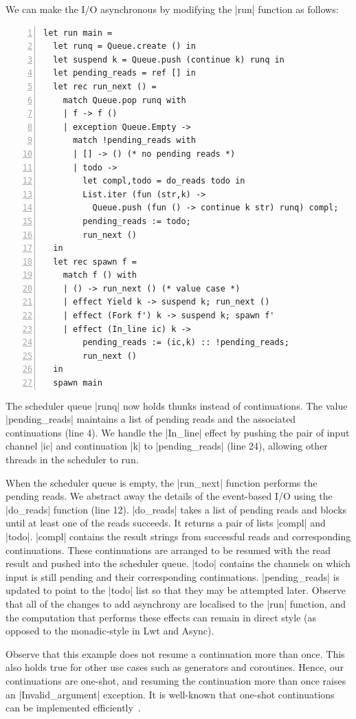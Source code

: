 \documentclass[sigplan,screen]{acmart}
\begin{document}
We can make the I/O asynchronous by modifying the |run| function as follows:

\begin{lstlisting}[numbers=left]
let run main =
  let runq = Queue.create () in
  let suspend k = Queue.push (continue k) runq in
  let pending_reads = ref [] in
  let rec run_next () =
    match Queue.pop runq with
    | f -> f ()
    | exception Queue.Empty ->
      match !pending_reads with
      | [] -> () (* no pending reads *)
      | todo ->
        let compl,todo = do_reads todo in
        List.iter (fun (str,k) ->
          Queue.push (fun () -> continue k str) runq) compl;
        pending_reads := todo;
        run_next ()
  in
  let rec spawn f =
    match f () with
    | () -> run_next () (* value case *)
    | effect Yield k -> suspend k; run_next ()
    | effect (Fork f') k -> suspend k; spawn f'
    | effect (In_line ic) k ->
        pending_reads := (ic,k) :: !pending_reads;
        run_next ()
  in
  spawn main
\end{lstlisting}

The scheduler queue |runq| now holds thunks instead of continuations. The value
|pending_reads| maintains a list of pending reads and the associated
continuations (line 4). We handle the |In_line| effect by pushing the pair of
input channel |ic| and continuation |k| to |pending_reads| (line 24), allowing
other threads in the scheduler to run.

When the scheduler queue is empty, the |run_next| function performs the pending
reads. We abstract away the details of the event-based I/O using the |do_reads|
function (line 12). |do_reads| takes a list of pending reads and blocks until
at least one of the reads succeeds. It returns a pair of lists |compl| and
|todo|. |compl| contains the result strings from successful reads and
corresponding continuations. These continuations are arranged to be resumed
with the read result and pushed into the scheduler queue. |todo| contains the
channels on which input is still pending and their corresponding continuations.
|pending_reads| is updated to point to the |todo| list so that they may be
attempted later. Observe that all of the changes to add asynchrony are
localised to the |run| function, and the computation that performs these
effects can remain in direct style (as opposed to the monadic-style in
Lwt and Async).

Observe that this example does not resume a continuation more than once. This
also holds true for other use cases such as generators and coroutines. Hence,
our continuations are one-shot, and resuming the continuation more than once
raises an |Invalid_argument| exception. It is well-known that one-shot
continuations can be implemented efficiently~\cite{Bruggeman96}.
\end{document}
